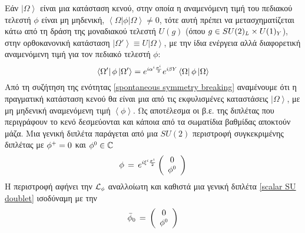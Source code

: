 Εάν $\left|\Omega\right>$ είναι μια κατάσταση κενού, στην οποία η αναμενόμενη τιμή του πεδιακού τελεστή $\phi$ είναι μη μηδενική, $\left<\Omega\right|{\phi}\left|\Omega\right>\ne 0$, 
τότε αυτή πρέπει να μετασχηματίζεται κάτω από τη δράση της μοναδιακού τελεστή $U(g)$ (όπου $g\in SU(2)\subscr{L}\times U(1)\subscr{Y}$), στην ορθοκανονική κατάσταση $\left|\Omega'\right>\equiv U\left|\Omega\right>$, με την ίδια ενέργεια αλλά διαφορετική αναμενόμενη τιμή για τον πεδιακό τελεστή $\phi$: 
\begin{equation}\label{vacuum exp value symmetry group action}
    \left<\Omega'\right|{\phi}\left|\Omega'\right> = e\superscr{i\alpha\superscr{i}\frac{\sigma\superscr{i}}{2}}e\superscr{i\beta Y}\left<\Omega\right|{\phi}\left|\Omega\right>
\end{equation}
Από τη συζήτηση της ενότητας \ref{spontaneous symmetry breaking} αναμένουμε ότι η πραγματική κατάσταση κενού θα είναι 
μια από τις εκφυλισμένες καταστάσεις $\left|\Omega\right>$, με μη μηδενική αναμενόμενη τιμή $\left<\phi\right>$. 
Ως αποτέλεσμα οι β.ε. της διπλέτας που περιγράφουν το κενό δεσμεύονται και κάποια από τα σωματίδια βαθμίδας αποκτούν μάζα. %
Μια γενική διπλέτα παράγεται από μια $SU(2)$ περιστροφή συγκεκριμένης διπλέτας με $\phi\superscr{+}=0$ και $\phi\superscr{0}\in\mathbb{C}$
\begin{equation}\label{scalar doublet with zero comp and su2 tran}
    \phi\,=\,e\superscr{i\xi\superscr{i}\frac{\sigma\superscr{i}}{2}}\left(\begin{array}{c} 0\\ \phi\superscr{0} \end{array}\right)
\end{equation}
Η 
περιστροφή αφήνει την $\mathcal{L}\subscr{\phi}$ αναλλοίωτη και καθιστά μια γενική διπλέτα \eqref{scalar SU doublet} ισοδύναμη %
με την 
\begin{equation}\label{scalar doublet with zero comp}
    \Bar{\phi}\subscr{0}\,=\,\left(\begin{array}{c} 0\\ \phi\superscr{0} \end{array}\right)
\end{equation}
